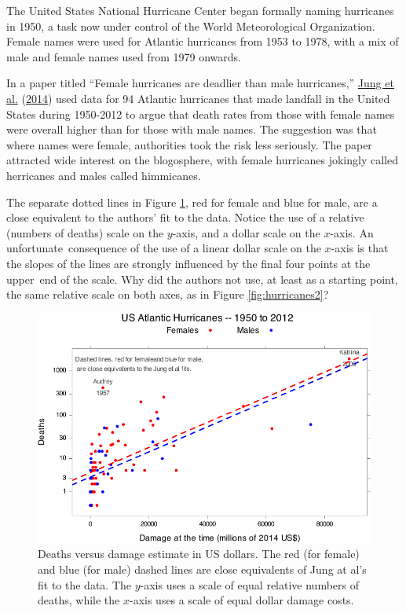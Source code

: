 \documentclass[
  10pt,
  b5paper]{book}
\begin{document}
The United States National Hurricane Center began formally naming
hurricanes in 1950, a task now under control of the
World Meteorological Organization. Female names were used for
Atlantic hurricanes from 1953 to 1978, with a mix of male and
female names used from 1979 onwards.

In a paper titled ``Female hurricanes are deadlier than male
hurricanes,'' \protect\hyperlink{ref-jung2014female}{Jung et al.} (\protect\hyperlink{ref-jung2014female}{2014}) used data for 94 Atlantic hurricanes
that made landfall in the United States during 1950-2012 to argue
that death rates from those with female names were overall higher
than for those with male names. The suggestion was that where names
were female, authorities took the risk less seriously. The paper
attracted wide interest on the blogosphere, with female hurricanes
jokingly called herricanes and males called himmicanes.

The separate dotted lines in Figure \ref{fig:hurricanes1}, red for
female and blue for male, are a close equivalent to the authors' fit
to the data. Notice the use of a relative (numbers of deaths) scale
on the \(y\)-axis, and a dollar scale on the \(x\)-axis.
An unfortunate~consequence of the use of a linear dollar scale
on the \(x\)-axis is that the slopes of the lines are strongly
influenced by the final four points at the upper~end of the scale.
Why did the authors not use, at least as a starting point, the same
relative scale on both axes, as in Figure \ref{fig:hurricanes2}?

\begin{figure}[H]

{\centering \includegraphics[width=0.85\linewidth]{08-observational_files/figure-latex/hurricanes1-1} 

}

\caption{Deaths versus damage estimate in US dollars. The red (for female) 
and blue (for male) dashed lines are close equivalents of Jung at al's fit
to the data. The $y$-axis uses a scale of equal relative numbers of deaths, 
while the $x$-axis uses a scale of equal dollar damage costs.}\label{fig:hurricanes1}
\end{figure}
\end{document}
